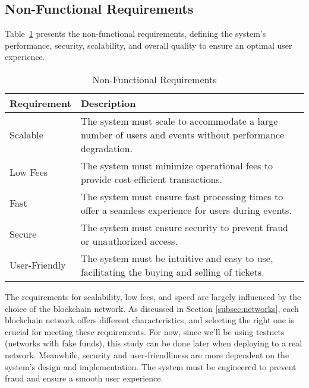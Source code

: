 \subsection{Non-Functional Requirements}
\label{subsec:non_functional_requirements}

Table~\ref{tab:non_functional_requirements} presents the non-functional
requirements, defining the system's performance, security, scalability, and
overall quality to ensure an optimal user experience.

\begin{table}[H]
    \caption{Non-Functional Requirements}
    \centering
    \begin{tabularx}{\textwidth}{lX}
        \hline
        \textbf{Requirement} & \textbf{Description}                                                                                     \\
        \hline
        Scalable             & The system must scale to accommodate a large number of users and events without performance degradation. \\
        \hline
        Low Fees             & The system must minimize operational fees to provide cost-efficient transactions.                        \\
        \hline
        Fast                 & The system must ensure fast processing times to offer a seamless experience for users during events.     \\
        \hline
        Secure               & The system must ensure security to prevent fraud or unauthorized access.                                 \\
        \hline
        User-Friendly        & The system must be intuitive and easy to use, facilitating the buying and selling of tickets.            \\
        \hline
    \end{tabularx}
    \label{tab:non_functional_requirements}
\end{table}

The requirements for scalability, low fees, and speed are largely influenced by
the choice of the blockchain network. As discussed in Section
\ref{subsec:networks}, each blockchain network offers different
characteristics, and selecting the right one is crucial for meeting these
requirements. For now, since we'll be using testnets (networks with fake
funds), this study can be done later when deploying to a real network.
Meanwhile, security and user-friendliness are more dependent on the system's
design and implementation. The system must be engineered to prevent fraud and
ensure a smooth user experience.
